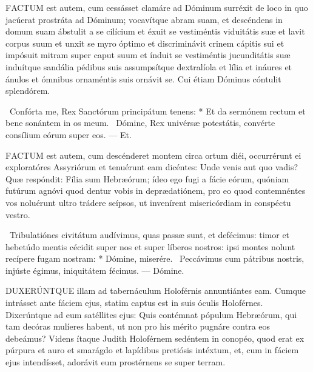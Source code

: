 


\lettrine[lines=2]{F}{ACTUM} est autem, cum cessásset clamáre ad Dóminum surréxit de loco in quo jacúerat prostráta ad Dóminum; vocavítque abram suam, et descéndens in domum suam ábstulit a se cilícium et éxuit se vestiméntis viduitátis suæ et lavit corpus suum et unxit se myro óptimo et discriminávit crinem cápitis sui et impósuit mitram super caput suum et índuit se vestiméntis jucunditátis suæ induítque sandália pédibus suis assumpsítque dextralíola et lília et ináures et ánulos et ómnibus ornaméntis suis ornávit se. Cui étiam Dóminus cóntulit splendórem.

\R\ Confórta me, Rex Sanctórum principátum tenens: * Et da sermónem rectum et bene sonántem in os meum. \V\ Dómine, Rex univérsæ potestátis, convérte consílium eórum super eos. — Et.


\lettrine[lines=2]{F}{ACTUM} est autem, cum descénderet montem circa ortum diéi, occurrérunt ei exploratóres Assyriórum et tenuérunt eam dicéntes: Unde venis aut quo vadis? Quæ respóndit: Fília sum Hebræórum; ídeo ego fugi a fácie eórum, quóniam futúrum agnóvi quod dentur vobis in deprædatiónem, pro eo quod contemnéntes vos noluérunt ultro trádere seípsos, ut invenírent misericórdiam in conspéctu vestro.

\R\ Tribulatiónes civitátum audívimus, quas passæ sunt, et defécimus: timor et hebetúdo mentis cécidit super nos et super líberos nostros: ipsi montes nolunt recípere fugam nostram: * Dómine, miserére. \V\ Peccávimus cum pátribus nostris, injúste égimus, iniquitátem fécimus. — Dómine.



\lettrine[lines=2]{D}{UXERÚNTQUE} illam ad tabernáculum Holoférnis annuntiántes eam. Cumque intrásset ante fáciem ejus, statim captus est in suis óculis Holoférnes. Dixerúntque ad eum satéllites ejus: Quis contémnat pópulum Hebræórum, qui tam decóras mulíeres habent, ut non pro his mérito pugnáre contra eos debeámus? Videns ítaque Judith Holoférnem sedéntem in conopéo, quod erat ex púrpura et auro et smarágdo et lapídibus pretiósis intéxtum, et, cum in fáciem ejus intendísset, adorávit eum prostérnens se super terram.

